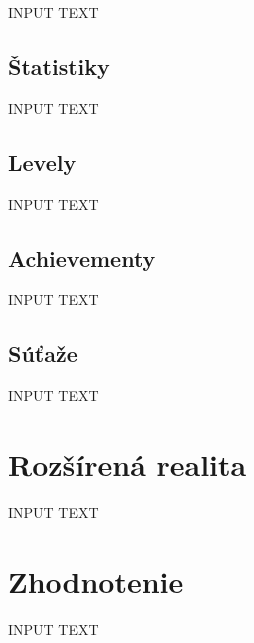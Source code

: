 \documentclass[10pt,slovak,a4paper]{article}
\begin{document}
INPUT TEXT

\subsection{Štatistiky} \label{statistics}

INPUT TEXT

\subsection{Levely} \label{levels}

INPUT TEXT

\subsection{Achievementy} \label{achievements}

INPUT TEXT

\subsection{Súťaže} \label{competitions}

INPUT TEXT

\section{Rozšírená realita} \label{Augmented_reality}

INPUT TEXT

\section{Zhodnotenie} \label{Evaluation}

INPUT TEXT



\end{document}
